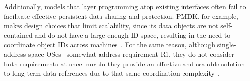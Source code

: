 Additionally, models that layer \NVM programming atop existing interfaces often fail to facilitate effective persistent data sharing and
protection.  PMDK, for example, makes design choices that limit
scalability, since its
data objects are not self-contained and do not have a large enough ID space, resulting
in the need to coordinate object IDs across machines~\cite{bittman:plos19}. For the same reason,
although single-address space OSes~\cite{chase:tocs94} somewhat address requirement R1, they do
not consider both requirements at once, nor do they provide an effective and scalable solution to
long-term data references due to that same coordination complexity~\cite{bittman:hotstorage19}.


